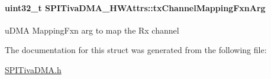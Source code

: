 \paragraph[{tx\+Channel\+Mapping\+Fxn\+Arg}]{\setlength{\rightskip}{0pt plus 5cm}uint32\+\_\+t S\+P\+I\+Tiva\+D\+M\+A\+\_\+\+H\+W\+Attrs\+::tx\+Channel\+Mapping\+Fxn\+Arg}\label{struct_s_p_i_tiva_d_m_a___h_w_attrs_a58b59e083a9e324970d63c46f3342afe}
u\+D\+M\+A Mapping\+Fxn arg to map the Rx channel 

The documentation for this struct was generated from the following file\+:\begin{DoxyCompactItemize}
\item 
\hyperlink{_s_p_i_tiva_d_m_a_8h}{S\+P\+I\+Tiva\+D\+M\+A.\+h}\end{DoxyCompactItemize}
